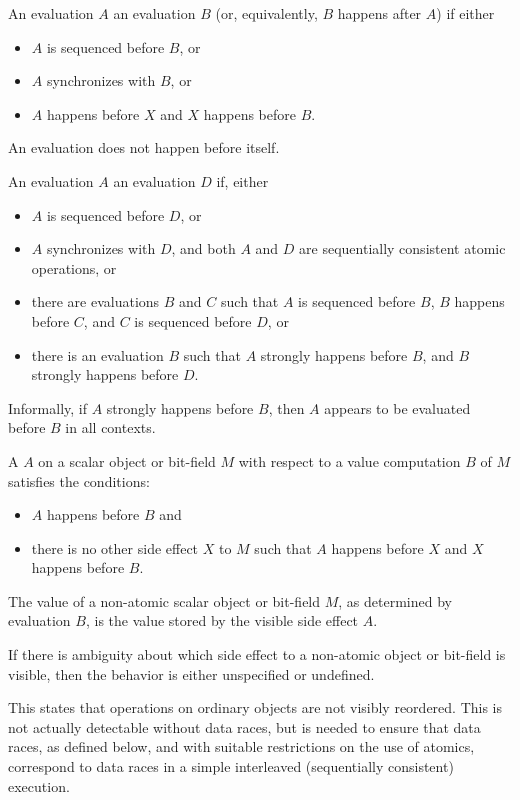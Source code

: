 \pnum
An evaluation $A$  an evaluation $B$
(or, equivalently, $B$ happens after $A$)
if either
\begin{itemize}
\item $A$ is sequenced before $B$, or
\item $A$ synchronizes with $B$, or
\item $A$ happens before $X$ and $X$ happens before $B$.
\end{itemize}
\begin{note}
An evaluation does not happen before itself.
\end{note}

\pnum
An evaluation $A$ 
an evaluation $D$ if, either
\begin{itemize}
\item $A$ is sequenced before $D$, or
\item $A$ synchronizes with $D$, and
both $A$ and $D$ are
sequentially consistent atomic operations, or
\item there are evaluations $B$ and $C$
such that $A$ is sequenced before $B$,
$B$ happens before $C$, and
$C$ is sequenced before $D$, or
\item there is an evaluation $B$ such that
$A$ strongly happens before $B$, and
$B$ strongly happens before $D$.
\end{itemize}
\begin{note}
Informally, if $A$ strongly happens before $B$,
then $A$ appears to be evaluated before $B$
in all contexts.
\end{note}

\pnum
A  $A$ on a scalar object or bit-field $M$
with respect to a value computation $B$ of $M$ satisfies the
conditions:
\begin{itemize}
\item $A$ happens before $B$ and
\item there is no other
%
side effect $X$ to $M$ such that $A$
happens before $X$ and $X$ happens before $B$.
\end{itemize}

The value of a non-atomic scalar object or bit-field $M$, as determined by
evaluation $B$, is the value stored by the
%
visible side effect $A$.
\begin{note}
If there is ambiguity about which side effect to a
non-atomic object or bit-field is visible, then the behavior is either
unspecified or undefined.
\end{note}
\begin{note}
This states that operations on
ordinary objects are not visibly reordered. This is not actually detectable
without data races, but is needed to ensure that data races, as defined
below, and with suitable restrictions on the use of atomics, correspond to data
races in a simple interleaved (sequentially consistent) execution.
\end{note}

